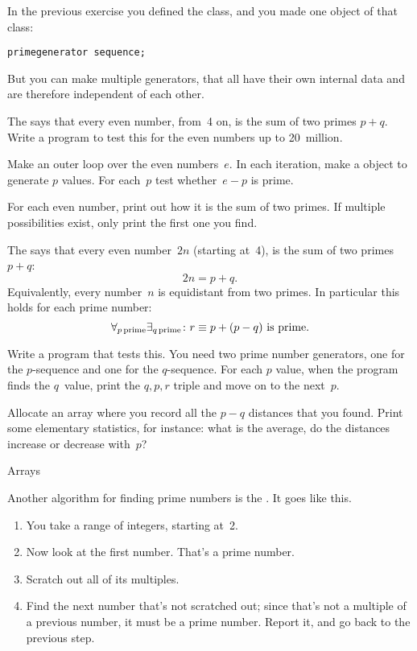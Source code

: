 In the previous exercise you defined the  class, and
you made one object of that class:
\begin{verbatim}
primegenerator sequence;
\end{verbatim}
But you can make multiple generators, that all have their own internal
data and are therefore independent of each other.

\begin{exercise}
  \label{ex:goldbach:conj}
  The  says that every even number,
  from~4 on, is the sum of two primes $p+q$. Write a program to test this
  for the even numbers up to 20~million.

  Make an outer loop over the even numbers~$e$. In each iteration,
  make a  object to generate $p$ values.
  For each~$p$ test whether~$e-p$ is prime.

  For each even number, print out how it is the sum of two primes. If
  multiple possibilities exist, only print the first one you find.
\end{exercise}

\begin{exercise}
  \label{ex:prime:goldbach-pqr}
  The  says that every even number~$2n$
  (starting at~4), is the sum of two primes $p+q$: \[ 2n=p+q.\]
  Equivalently, every number~$n$ is equidistant from two primes. In
  particular this holds for each prime number:
  \[ \forall_{p\,\mathrm{prime}}\exists_{q\,\mathrm{prime}}\colon
  \hbox{$r\equiv p+(p-q)$ is prime}. \]

  Write a program that tests this. You need two prime number
  generators, one for the $p$-sequence and one for the $q$-sequence.
  For each $p$ value, 
  when the program finds the $q$~value, print the $q,p,r$ triple and
  move on to the next~$p$.

  Allocate an array where you record all the $p-q$ distances that you
  found. Print some elementary statistics, for instance: what is the average, do the
  distances increase or decrease with~$p$?
\end{exercise}

 {Arrays}

Another algorithm for finding prime numbers is the
. It goes like this.
\begin{enumerate}
\item You take a range of integers, starting at~2.
\item Now look at the first number. That's a prime number.
\item Scratch out all of its multiples.
\item Find the next number that's not scratched out; since that's
  not a multiple of a previous number, it must be a prime
  number. Report it, and go back to the previous step.
\end{enumerate}

